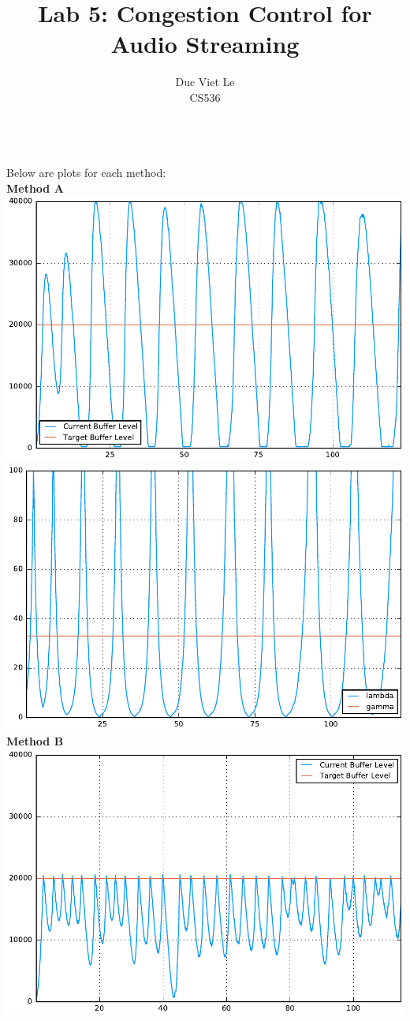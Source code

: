 \documentclass[12pt]{article}
\newenvironment{problem}[2][Problem]{\begin{trivlist}
\item[\hskip \labelsep {\bfseries #1}\hskip \labelsep {\bfseries #2.}]}{\end{trivlist}}
\begin{document}
 
\title{Lab 5: Congestion Control for Audio Streaming}
\author{Duc Viet Le\\
 CS536}
 
\maketitle
 
\begin{problem}{1} \ \\
Below are plots for each method:
\\
\textbf{Method A} \\
\includegraphics[scale = .5]{listen0.pdf}
\includegraphics[scale = .5]{stream0.pdf}
\\
\textbf{Method B} \\
\includegraphics[scale = .5]{listen1.pdf}

\end{problem}
\end{document}
